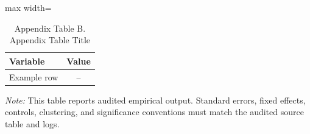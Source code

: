 \documentclass[UTF8]{ctexart}
\begin{document}
\begin{table}[!htbp]
\centering
\caption{Appendix Table B. Appendix Table Title}
\begin{threeparttable}
\small
\begin{adjustbox}{max width=\textwidth}
\begin{tabular}{lc}
\toprule
Variable & Value \\
\midrule
Example row & -- \\
\bottomrule
\end{tabular}
\end{adjustbox}
\begin{tablenotes}
\footnotesize
\item \textit{Note:} This table reports audited empirical output. Standard errors, fixed effects, controls, clustering, and significance conventions must match the audited source table and logs.
\end{tablenotes}
\end{threeparttable}
\end{table}

\end{document}
